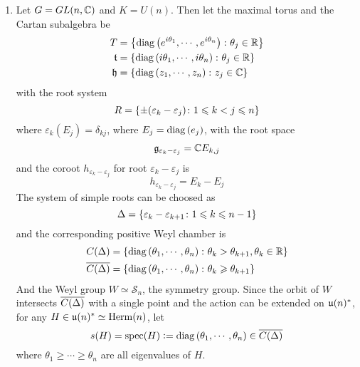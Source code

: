 \documentclass[a4paper,12pt]{article}
\begin{document}
	\begin{exam}
		\begin{enumerate}
			\item Let $G=GL(n,\mathbb{C})$ and $K = U(n)$. Then let the maximal torus and the Cartan subalgebra be
			\begin{equation*}
				\begin{split}
					T &= \left\{\operatorname{diag}\left(e^{i\theta_1},\cdots,e^{i\theta_n}\right) \colon \theta_j \in \mathbb{R}\right\}\\
					\mathfrak{t} &= \left\{\operatorname{diag}\left({i\theta_1},\cdots,{i\theta_n}\right) \colon \theta_j \in \mathbb{R}\right\}\\
					\mathfrak{h} &= \left\{\operatorname{diag}\left({ z_1},\cdots,{ z_n}\right) \colon z_j \in \mathbb{C}\right\}
				\end{split}
			\end{equation*}
			with the root system
			\begin{equation*}
				R = \left\{\pm (\varepsilon_k-\varepsilon_j) \colon 1 \leqslant k < j \leqslant n\right\}
			\end{equation*}
			where $\varepsilon_k(E_j) = \delta_{kj}$, where $E_j = \operatorname{diag}\left(e_j\right)$, with the root space
			\begin{equation*}
				\mathfrak{g}_{\varepsilon_k-\varepsilon_j} = \mathbb{C} E_{k,j}
			\end{equation*}
			and the coroot $h_{\varepsilon_k-\varepsilon_j}$ for root $\varepsilon_k-\varepsilon_j$ is
			\begin{equation*}
				h_{\varepsilon_k-\varepsilon_j} = E_k - E_j
			\end{equation*}
			The system of simple roots can be choosed as
			\begin{equation*}
				\Delta = \left\{\varepsilon_k-\varepsilon_{k+1} \colon 1\leqslant k \leqslant n-1\right\}
			\end{equation*}
			and the corresponding positive Weyl chamber is
			\begin{equation*}
				\begin{split}
					C(\Delta) &= \left\{\operatorname{diag}\left({\theta_1},\cdots,{\theta_n}\right) \colon \theta_k > \theta_{k+1},\theta_k \in \mathbb{R}\right\} \\
					\overline{C(\Delta)} &= \left\{\operatorname{diag}\left({\theta_1},\cdots,{\theta_n}\right) \colon \theta_k \geqslant \theta_{k+1}\right\}
				\end{split}
			\end{equation*}
			And the Weyl group $W \simeq \mathcal{S}_n$, the symmetry group. Since the orbit of $W$ intersects $\overline{C(\Delta)}$ with a single point and the action can be extended on $\mathfrak{u}(n)^*$, for any $H \in \mathfrak{u}(n)^* \simeq \operatorname{Herm}(n)$, let
			\begin{equation*}
			 	s(H)  = \operatorname{spec}(H) \vcentcolon= \operatorname{diag}\left(\theta_1,\cdots,\theta_n\right) \in \overline{C(\Delta)}
			\end{equation*} 
			where $\theta_1\geqslant \cdots\geqslant \theta_n$ are all eigenvalues of $H$.


\end{enumerate}
\end{exam}
\end{document}
